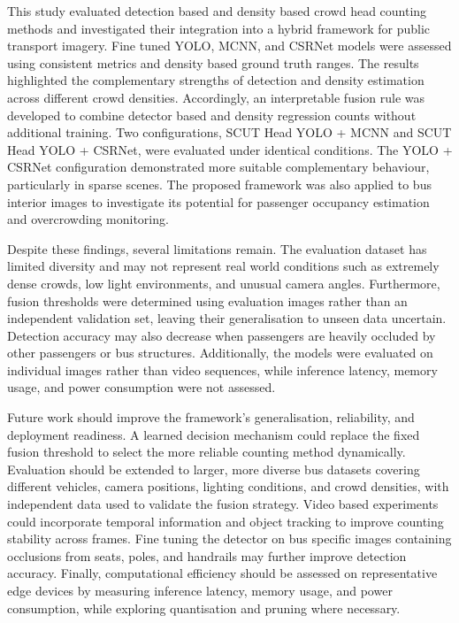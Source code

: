\documentclass[12pt,a4paper]{report}
\begin{document}
This study evaluated detection based and density based crowd head counting methods and investigated their integration into a hybrid framework for public transport imagery. Fine tuned YOLO, MCNN, and CSRNet models were assessed using consistent metrics and density based ground truth ranges. The results highlighted the complementary strengths of detection and density estimation across different crowd densities. Accordingly, an interpretable fusion rule was developed to combine detector based and density regression counts without additional training. Two configurations, SCUT Head YOLO + MCNN and SCUT Head YOLO + CSRNet, were evaluated under identical conditions. The YOLO + CSRNet configuration demonstrated more suitable complementary behaviour, particularly in sparse scenes. The proposed framework was also applied to bus interior images to investigate its potential for passenger occupancy estimation and overcrowding monitoring.

Despite these findings, several limitations remain. The evaluation dataset has limited diversity and may not represent real world conditions such as extremely dense crowds, low light environments, and unusual camera angles. Furthermore, fusion thresholds were determined using evaluation images rather than an independent validation set, leaving their generalisation to unseen data uncertain. Detection accuracy may also decrease when passengers are heavily occluded by other passengers or bus structures. Additionally, the models were evaluated on individual images rather than video sequences, while inference latency, memory usage, and power consumption were not assessed.

Future work should improve the framework's generalisation, reliability, and deployment readiness. A learned decision mechanism could replace the fixed fusion threshold to select the more reliable counting method dynamically. Evaluation should be extended to larger, more diverse bus datasets covering different vehicles, camera positions, lighting conditions, and crowd densities, with independent data used to validate the fusion strategy. Video based experiments could incorporate temporal information and object tracking to improve counting stability across frames. Fine tuning the detector on bus specific images containing occlusions from seats, poles, and handrails may further improve detection accuracy. Finally, computational efficiency should be assessed on representative edge devices by measuring inference latency, memory usage, and power consumption, while exploring quantisation and pruning where necessary.

\begingroup
\let\clearpage\relax
\renewcommand{\bibname}{References}


\endgroup
\end{document}
